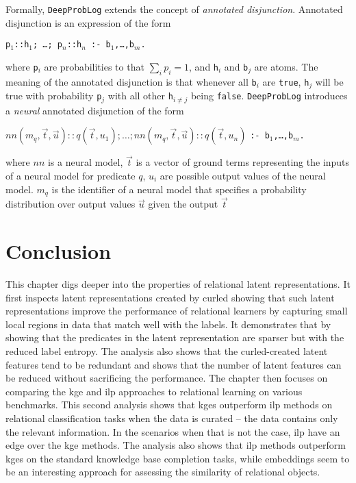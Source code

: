 \begin{tcolorbox}
	Formally, \texttt{DeepProbLog} extends the concept of \textit{annotated disjunction}.
	Annotated disjunction is an expression of the form
	\begin{center}
		\texttt{p$_1${::}h$_1$; \ldots; p$_n${::}h$_n$ {:-} b$_1$,\ldots,b$_m$.}
	\end{center}
	where \texttt{p$_i$} are probabilities to that $\sum_ip_i=1$, and \texttt{h$_i$} and \texttt{b$_j$} are atoms.
	The meaning of the annotated disjunction is that whenever all \texttt{b$_i$} are \texttt{true}, \texttt{h$_j$} will be true with probability \texttt{p$_j$} with all other \texttt{h$_{i \neq j}$} being \texttt{false}.
	\texttt{DeepProbLog} introduces a \textit{neural} annotated disjunction of the form
	\begin{center}
			$nn(m_q,\vec{t}, \vec{u}) :: q(\vec{t},u_1); \ldots; nn(m_q,\vec{t}, \vec{u}) :: q(\vec{t},u_n) $ \texttt{{:-} b$_1$,\ldots,b$_m$.}
	\end{center}
	where $nn$ is a neural model, $\vec{t}$ is a vector of ground terms representing the inputs of a neural model for predicate $q$, $u_i$ are possible output values of the neural model.
	$m_q$ is the identifier of a neural model that specifies a probability distribution over output values $\vec{u}$ given the output $\vec{t}$
\end{tcolorbox}


\section{Conclusion}


This chapter digs deeper into the properties of relational latent representations.
It first inspects latent representations created by \gls{curled} showing that such latent representations improve the performance of relational learners by capturing small local regions in data that match well with the labels.
It demonstrates that by showing that the predicates in the latent representation are sparser but with the reduced label entropy.
The analysis also shows that the \gls{curled}-created latent features tend to be redundant and shows that the number of latent features can be reduced without sacrificing the performance.
The chapter then focuses on comparing the \gls{kge} and \gls{ilp} approaches to relational learning on various benchmarks.
This second analysis shows that \gls{kge}s outperform \gls{ilp} methods on relational classification tasks when the data is curated -- the data contains only the relevant information.
In the scenarios when that is not the case, \gls{ilp} have an edge over the \gls{kge} methods.
The analysis also shows that \gls{ilp} methods outperform \gls{kge}s on the standard knowledge base completion tasks, while embeddings seem to be an interesting approach for assessing the similarity of relational objects.



\cleardoublepage

